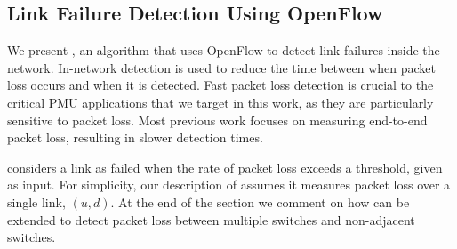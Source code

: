 
\subsection{Link Failure Detection Using OpenFlow}
\label{subsec:pcnt}





We present \pcnts, an algorithm that uses OpenFlow to detect link failures inside the network.  In-network detection is used to reduce the time between when packet loss occurs and when it is detected. 
Fast packet loss detection is crucial to the critical PMU applications that we target in this work, as they are particularly sensitive to packet loss. Most previous work \cite{Almes99,Caceres99, 
Friedl09} focuses on measuring end-to-end packet loss, resulting in slower detection times. 

\pcnt considers a link as failed when the rate of packet loss exceeds a threshold, given as input. For simplicity, our description of \pcnt assumes it measures packet loss over a single 
link, $(u,d)$.  At the end of the section we comment on how \pcnt can be extended to detect packet loss between multiple switches and non-adjacent switches.  

